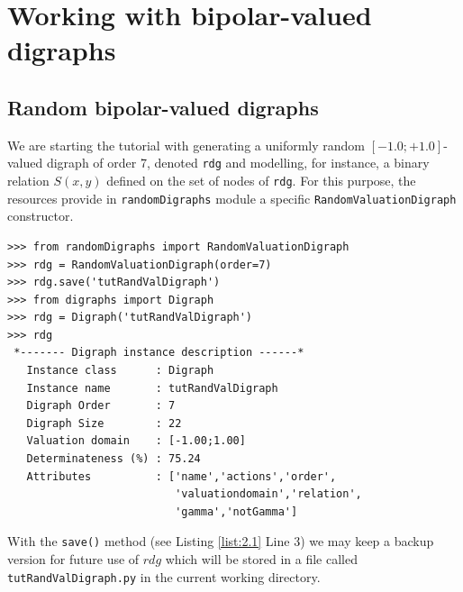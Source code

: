 \chapter{Working with bipolar-valued digraphs}
\label{sec:2}



\section{Random bipolar-valued digraphs}

We are starting the tutorial with generating a uniformly random $[-1.0; +1.0]$-valued digraph of order 7, denoted \texttt{rdg} and modelling, for instance, a binary relation $S(x,y)$ defined on the set of nodes of \texttt{rdg}. For this purpose, the \Digraph resources provide in {\tt randomDigraphs} module a specific {\tt RandomValuationDigraph} constructor.
\begin{lstlisting}[caption={Random bipolar-valued digraph instance},label=list:2.1]
>>> from randomDigraphs import RandomValuationDigraph
>>> rdg = RandomValuationDigraph(order=7)
>>> rdg.save('tutRandValDigraph')
>>> from digraphs import Digraph
>>> rdg = Digraph('tutRandValDigraph')
>>> rdg
 *------- Digraph instance description ------*
   Instance class      : Digraph
   Instance name       : tutRandValDigraph
   Digraph Order       : 7
   Digraph Size        : 22
   Valuation domain    : [-1.00;1.00]
   Determinateness (%) : 75.24
   Attributes          : ['name','actions','order',
                          'valuationdomain','relation',
                          'gamma','notGamma']
\end{lstlisting}   
With the {\tt save()}  method (see Listing \ref{list:2.1} Line 3) we may keep a backup version for future use of $rdg$ which will be stored in a file called {\tt tutRandValDigraph.py} in the current working directory.

